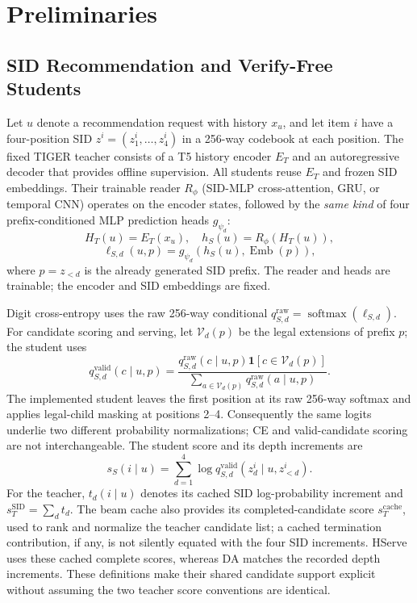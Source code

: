 \documentclass[sigconf, anonymous, review]{acmart}
\begin{document}
\section{Preliminaries}
\label{sec:prelim}

\subsection{SID Recommendation and Verify-Free Students}
\label{sec:prelim-models}

Let $u$ denote a recommendation request with history $x_u$,
and let item $i$ have a four-position SID
$z^i=(z_1^i,\ldots,z_4^i)$ in a 256-way codebook at each position.
The fixed TIGER teacher consists of a T5 history encoder $E_T$
and an autoregressive decoder that provides offline supervision.
All students reuse $E_T$ and frozen SID embeddings. Their trainable
reader $R_\phi$ (SID-MLP cross-attention, GRU, or temporal CNN)
operates on the encoder states, followed by the \emph{same kind}
of four prefix-conditioned MLP prediction heads $g_{\psi_d}$:
\begin{equation}
H_T(u)=E_T(x_u),\quad h_S(u)=R_\phi(H_T(u)),
\label{eq:student-flow}
\end{equation}
\begin{equation}
\ell_{S,d}(u,p)=g_{\psi_d}(h_S(u),\operatorname{Emb}(p)),
\label{eq:student-head}
\end{equation}
where $p=z_{<d}$ is the already generated SID prefix. The
reader and heads are trainable; the encoder and SID embeddings
are fixed.

Digit cross-entropy uses the raw 256-way conditional
$q^{\mathrm{raw}}_{S,d}=\operatorname{softmax}(\ell_{S,d})$.
For candidate scoring and serving, let $\mathcal V_d(p)$ be
the legal extensions of prefix $p$; the student uses
\begin{equation}
q^{\mathrm{valid}}_{S,d}(c\mid u,p)=
\frac{q^{\mathrm{raw}}_{S,d}(c\mid u,p)
\mathbf1[c\in\mathcal V_d(p)]}
{\sum_{a\in\mathcal V_d(p)}
q^{\mathrm{raw}}_{S,d}(a\mid u,p)}.
\label{eq:valid-conditional}
\end{equation}
The implemented student leaves the first position at its raw
256-way softmax and applies legal-child masking at positions 2--4.
Consequently the same logits underlie two different probability
normalizations; CE and valid-candidate scoring are not interchangeable.
The student score and its depth increments are
\begin{equation}
s_S(i\mid u)=\sum_{d=1}^{4}
\log q^{\mathrm{valid}}_{S,d}(z_d^i\mid u,z_{<d}^i).
\label{eq:serving-scores}
\end{equation}
For the teacher, $t_d(i\mid u)$ denotes its cached SID
log-probability increment and $s_T^{\mathrm{SID}}=\sum_dt_d$.
The beam cache also provides its completed-candidate score
$s_T^{\mathrm{cache}}$, used to rank and normalize the teacher
candidate list; a cached termination contribution, if any,
is not silently equated with the four SID increments.
HServe uses these cached complete scores, whereas DA matches
the recorded depth increments. These definitions make their
shared candidate support explicit without assuming the
two teacher score conventions are identical.
\end{document}
